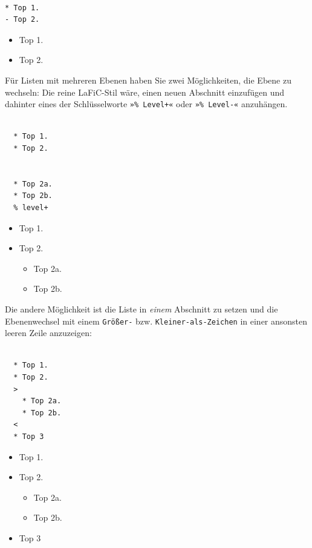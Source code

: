 \documentclass{scrartcl}
\begin{document}
\begin{verbatim}

* Top 1.
- Top 2.
\end{verbatim}


\begin{itemize}
\item Top 1.
\item Top 2.
\end{itemize}


{Für Listen mit mehreren Ebenen haben Sie zwei Möglichkeiten,
die Ebene zu wechseln: Die reine LaFiC-Stil wäre, einen
neuen Abschnitt einzufügen und dahinter eines der
Schlüsselworte \texttt{»\% Level+«} oder \texttt{»\% Level-«} anzuhängen.\\}

\begin{verbatim}

  * Top 1.
  * Top 2.


  * Top 2a.
  * Top 2b.
  % level+
\end{verbatim}


\begin{itemize}
\item Top 1.
\item Top 2.

\begin{itemize}
\item Top 2a.
\item Top 2b.
\end{itemize}

\end{itemize}


{Die andere Möglichkeit ist die Liste in \emph{einem} Abschnitt zu
setzen und die Ebenenwechsel mit einem \texttt{Größer-}
bzw. \texttt{Kleiner-als-Zeichen} in einer ansonsten leeren Zeile anzuzeigen:\\}

\begin{verbatim}

  * Top 1.
  * Top 2.
  >
    * Top 2a.
    * Top 2b.
  <
  * Top 3
\end{verbatim}


\begin{itemize}
\item Top 1.
\item Top 2.
\begin{itemize}
\item Top 2a.
\item Top 2b.
\end{itemize}
\item Top 3
\end{itemize}
\end{document}
